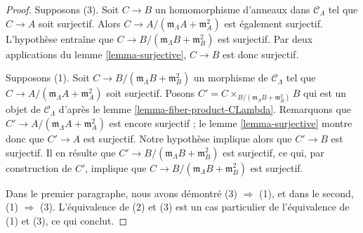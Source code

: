 \begin{proof}
Supposons (3). Soit $C \to B$ un homomorphisme d'anneaux dans
$\mathcal{C}_\Lambda$ tel que $C \to A$ soit surjectif. Alors
$C \to A/(\mathfrak m_\Lambda A + \mathfrak m_A^2)$ est également surjectif.
L'hypothèse entraîne que
$C \to B/(\mathfrak m_\Lambda B + \mathfrak m_B^2)$ est surjectif. Par deux
applications du lemme \ref{lemma-surjective}, $C \to B$ est donc surjectif.

\medskip\noindent
Supposons (1). Soit $C \to B/(\mathfrak m_\Lambda B + \mathfrak m_B^2)$ un
morphisme de $\mathcal{C}_\Lambda$ tel que
$C \to A/(\mathfrak m_\Lambda A + \mathfrak m_A^2)$ soit surjectif. Posons
$C' = C \times_{B/(\mathfrak m_\Lambda B + \mathfrak m_B^2)} B$
qui est un objet de $\mathcal{C}_\Lambda$ d'après le lemme
\ref{lemma-fiber-product-CLambda}. Remarquons que
$C' \to A/(\mathfrak m_\Lambda A + \mathfrak m_A^2)$ est encore surjectif ;
le lemme \ref{lemma-surjective} montre donc que $C' \to A$ est surjectif.
Notre hypothèse implique alors que $C' \to B$ est surjectif. Il en résulte que
$C' \to B/(\mathfrak m_\Lambda B + \mathfrak m_B^2)$ est surjectif, ce qui,
par construction de $C'$, implique que
$C \to B/(\mathfrak m_\Lambda B + \mathfrak m_B^2)$ est surjectif.

\medskip\noindent
Dans le premier paragraphe, nous avons démontré (3) $\Rightarrow$ (1), et dans
le second, (1) $\Rightarrow$ (3). L'équivalence de (2) et (3) est un cas
particulier de l'équivalence de (1) et (3), ce qui conclut.
\end{proof}

